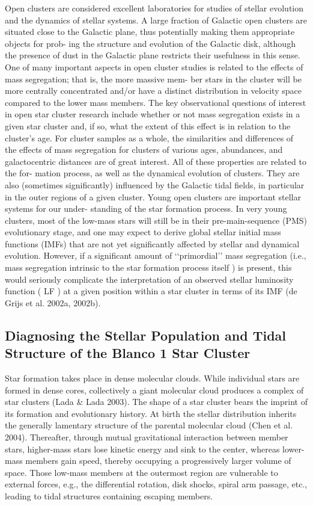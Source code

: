 \documentclass[../Main.tex]{subfiles}
\begin{document}
{Open clusters are considered excellent laboratories for studies
of stellar evolution and the dynamics of stellar systems. A large
fraction of Galactic open clusters are situated close to the Galactic
plane, thus potentially making them appropriate objects for prob-
ing the structure and evolution of the Galactic disk, although the
presence of dust in the Galactic plane restricts their usefulness in
this sense.
One of many important aspects in open cluster studies is related
to the effects of mass segregation; that is, the more massive mem-
ber stars in the cluster will be more centrally concentrated and/or
have a distinct distribution in velocity space compared to the lower
mass members. The key observational questions of interest in open
star cluster research include whether or not mass segregation exists
in a given star cluster and, if so, what the extent of this effect is in
relation to the cluster’s age. For cluster samples as a whole, the
similarities and differences of the effects of mass segregation for
clusters of various ages, abundances, and galactocentric distances
are of great interest. All of these properties are related to the for-
mation process, as well as the dynamical evolution of clusters.
They are also (sometimes significantly) influenced by the Galactic
tidal fields, in particular in the outer regions of a given cluster.
Young open clusters are important stellar systems for our under-
standing of the star formation process. In very young clusters, most
of the low-mass stars will still be in their pre-main-sequence (PMS)
evolutionary stage, and one may expect to derive global stellar initial mass functions (IMFs) that are not yet significantly affected
by stellar and dynamical evolution. However, if a significant amount
of ‘‘primordial’’ mass segregation (i.e., mass segregation intrinsic
to the star formation process itself ) is present, this would seriously
complicate the interpretation of an observed stellar luminosity
function ( LF ) at a given position within a star cluster in terms
of its IMF (de Grijs et al. 2002a, 2002b).

\subsection{Diagnosing the Stellar Population and Tidal Structure of the Blanco 1 Star Cluster}

Star formation takes place in dense molecular clouds. While
individual stars are formed in dense cores, collectively a giant
molecular cloud produces a complex of star clusters (Lada &
Lada 2003). The shape of a star cluster bears the imprint of its
formation and evolutionary history. At birth the stellar
distribution inherits the generally lamentary structure of the
parental molecular cloud (Chen et al. 2004). Thereafter,
through mutual gravitational interaction between member stars,
higher-mass stars lose kinetic energy and sink to the center,
whereas lower-mass members gain speed, thereby occupying a
progressively larger volume of space. Those low-mass
members at the outermost region are vulnerable to external
forces, e.g., the differential rotation, disk shocks, spiral arm
passage, etc., leading to tidal structures containing escaping
members.

}
\end{document}
